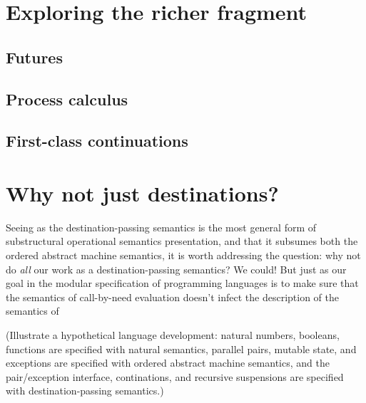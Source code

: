 \section{Exploring the richer fragment}

\subsection{Futures}

\subsection{Process calculus}

\subsection{First-class continuations}

\section{Why not just destinations?}

Seeing as the destination-passing semantics is the most general form
of substructural operational semantics presentation, and that it
subsumes both the ordered abstract machine semantics, it is worth
addressing the question: why not do {\it all} our work as a
destination-passing semantics? We could! But just as our goal in the
modular specification of programming languages is to make sure that
the semantics of call-by-need evaluation doesn't infect the
description of the semantics of

(Illustrate a hypothetical language development: natural numbers,
booleans, functions are specified with natural semantics, parallel
pairs, mutable state, and exceptions are specified with ordered
abstract machine semantics, and the pair/exception interface,
continations, and recursive suspensions are specified with
destination-passing semantics.)

